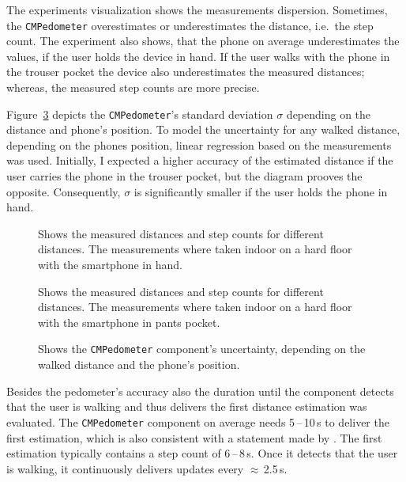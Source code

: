 The experiments visualization shows the measurements dispersion. Sometimes, the \texttt{CMPedometer} overestimates or underestimates the distance, i.e.\ the step count. The experiment also shows, that the phone on average underestimates the values, if the user holds the device in hand. If the user walks with the phone in the trouser pocket the device also underestimates the measured distances; whereas, the measured step counts are more precise.

Figure~\ref{fig:eval:pedometerNDF} depicts the \texttt{CMPedometer}'s standard deviation $\sigma$ depending on the distance and phone's position. To model the uncertainty for any walked distance, depending on the phones position, linear regression based on the measurements was used. Initially, I expected a higher accuracy of the estimated distance if the user carries the phone in the trouser pocket, but the diagram prooves the opposite. Consequently, $\sigma$ is significantly smaller if the user holds the phone in hand.

\begin{figure}
      
	\caption{Shows the measured distances and step counts for different distances. The measurements where taken indoor on a hard floor with the smartphone in hand.}
	\label{fig:eval:pedometerHand}
\end{figure}

\begin{figure}
  
  \caption{Shows the measured distances and step counts for different distances. The measurements where taken indoor on a hard floor with the smartphone in pants pocket.}
  \label{fig:eval:pedometerPocket}
\end{figure}

\begin{figure}
  
  \caption {Shows the \texttt{CMPedometer} component's uncertainty, depending on the walked distance and the phone's position.}
  \label{fig:eval:pedometerNDF}
\end{figure}


Besides the pedometer's accuracy also the duration until the component detects that the user is walking and thus delivers the first distance estimation was evaluated. The \texttt{CMPedometer} component on average needs 5\,--\,10\,s to deliver the first estimation, which is also consistent with a statement made by \citet{apple:wwdc_2014_pham}. The first estimation typically contains a step count of 6\,--\,8\,s. Once it detects that the user is walking, it continuously delivers updates every $\approx$\,2.5\,s.

